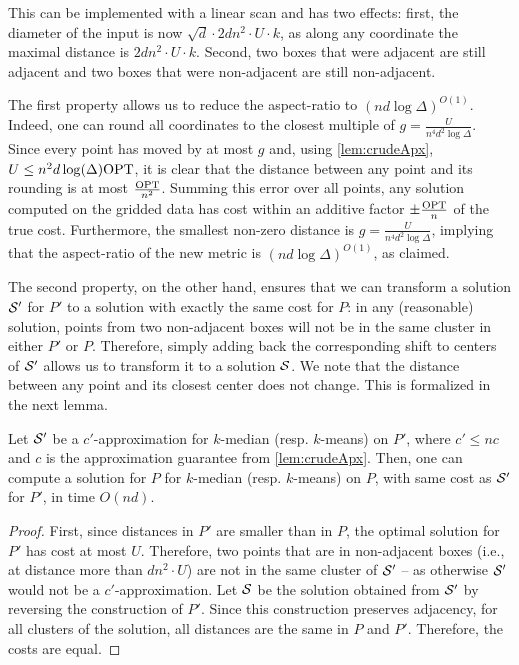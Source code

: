 This can be implemented with a linear scan and has two effects: first, the diameter of the input is now $\sqrt{d} \cdot 2d n^2\cdot U \cdot k$, as along any
coordinate the maximal distance is $2d n^2\cdot U \cdot k$. Second, two boxes that were adjacent are still adjacent and two boxes that were non-adjacent are
still non-adjacent.

The first property allows us to reduce the aspect-ratio to $(nd \log \Delta)^{O(1)}$.  Indeed, one can round all coordinates to the closest multiple of
$g = \frac{U}{n^4 d^{2} \log \Delta}$. Since every point has moved by at most $g$ and, using \cref{lem:crudeApx}, $U
\leq n^2 d \log(\Delta) \text{OPT}$, it is clear that the distance between any point and its rounding is at most $\frac{\text{OPT}}{n^2}$. Summing this error over all points,
any solution computed on the gridded data has cost within an additive factor $\pm \frac{\text{OPT}}{n}$ of the true cost. Furthermore, the smallest
non-zero distance is $g = \frac{U}{n^4 d^{2} \log \Delta}$, implying that the aspect-ratio of the new metric is $(nd \log \Delta)^{O(1)}$,
as claimed.

The second property, on the other hand, ensures that we can transform a solution $\mathcal S'$ for $P'$ to a solution with exactly the same cost for $P$: in any
(reasonable) solution, points from two non-adjacent boxes will not be in the same cluster in either $P'$ or $P$. Therefore, simply adding back the corresponding
shift to centers of $\mathcal S'$ allows us to transform it to a solution $\mathcal S$. We note that the distance between any point and its closest center does not
change. This is formalized in the next lemma.

\begin{lemma}
Let $\mathcal S'$ be a $c'$-approximation for  $k$-median (resp. $k$-means) on $P'$, where $c' \leq nc$ and $c$ is the approximation guarantee from
\cref{lem:crudeApx}. Then, one can compute a solution for $P$ for $k$-median (resp. $k$-means) on $P$, with same cost as $\mathcal S'$ for $P'$, in time $O(nd)$.
\end{lemma}
\begin{proof}

First, since distances in $P'$ are smaller than in $P$, the optimal solution for $P'$ has cost at most $U$. Therefore, two points that are in non-adjacent boxes
(i.e., at distance more than $d n^2\cdot U$) are not in the same cluster of $\mathcal S'$ -- as otherwise $\mathcal S'$ would not be a $c'$-approximation.  Let $\mathcal S$ be
the solution obtained from $\mathcal S'$ by reversing the construction of $P'$. Since this construction preserves adjacency, for all clusters of the solution, all
distances are the same in $P$ and $P'$. Therefore, the costs are equal.
\end{proof}
